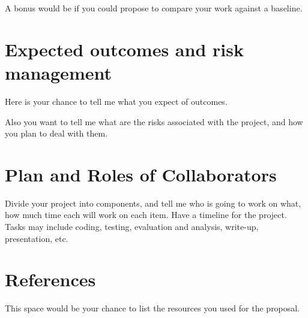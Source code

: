 \documentclass[conference]{sig-alternate-05-2015}
\begin{document}
A bonus would be if you could propose to compare your work against a baseline. 
\color{black}

\section{Expected outcomes and risk management}

\color{red}Here is your chance to tell me what you expect of outcomes.

Also you want to tell me what are the risks associated with the project, and how you plan to deal with them.
\color{black}

\section{Plan and Roles of Collaborators}
\color{red}Divide your project into components, and tell me who is going to work on what, how much time each will work on each item. Have a timeline for the project. Tasks may include coding, testing, evaluation and analysis, write-up, presentation, etc.
\color{black}

\section{References}\label{sec:conclusion}
\color{red}This space would be your chance to list the resources you used for the proposal.
\color{black}


\end{document}

